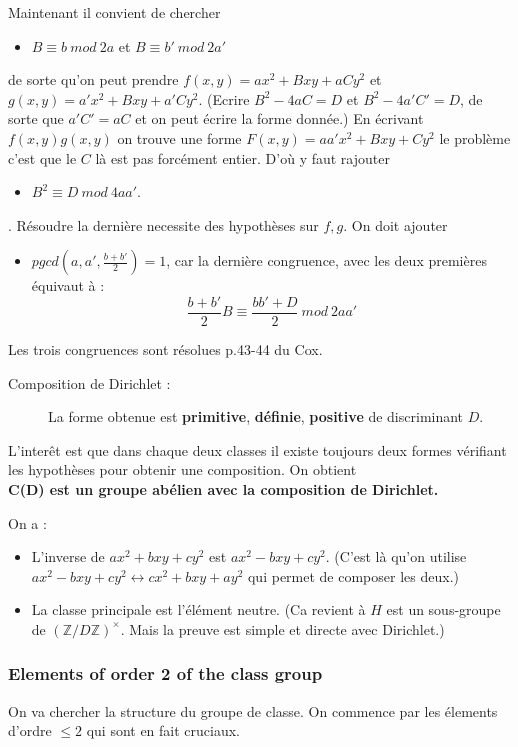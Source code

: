 \documentclass[12pt]{article}
\theoremstyle{plain}
\newcommand{\Z}{\mathbb{Z}}
\newcommand{\gr}{\color{Sepia}}
\begin{document}
Maintenant il convient de chercher
\begin{itemize}
    \item $B\equiv b~mod~2a$ et $B\equiv b'~mod~2a'$
\end{itemize}
de sorte qu'on peut prendre $f(x,y)=ax^2+Bxy+aCy^2$ et $g(x,y)=a'x^2+Bxy+a'Cy^2$. (Ecrire $B^2-4aC=D$ et $B^2-4a'C'=D$, de sorte que $a'C'=aC$ et on peut écrire la forme donnée.)
En écrivant $f(x,y)g(x,y)$ on trouve une forme $F(x,y)=aa'x^2+Bxy+Cy^2$ le problème c'est que le $C$ là est pas forcément entier. D'où
y faut rajouter 
\begin{itemize}
    \item $B^2\equiv D~mod~4aa'$.
\end{itemize}. Résoudre la dernière necessite des hypothèses sur $f,g$. On doit ajouter
\begin{itemize}
    \item $pgcd(a, a', \frac{b+b'}{2})=1$, car la dernière congruence, avec les deux premières équivaut à : $$\frac{b+b'}{2}B\equiv\frac{bb'+D}{2}~mod~2aa'$$
\end{itemize}
Les trois congruences sont résolues p.43-44 du Cox. 
\begin{description}
    \item[Composition de Dirichlet :] La forme obtenue est \textbf{primitive}, \textbf{définie}, \textbf{positive} de discriminant $D$.
\end{description}

L'interêt est que dans chaque deux classes il existe toujours deux formes vérifiant les hypothèses pour obtenir une composition. On obtient\\

\textbf{\gr C(D) est un groupe abélien avec la composition de Dirichlet.}

On a :
\begin{itemize}
    \item L'inverse de $ax^2+bxy+cy^2$ est $ax^2-bxy+cy^2$. (C'est là qu'on utilise $ax^2-bxy+cy^2\leftrightarrow cx^2+bxy+ay^2$ qui permet de composer les deux.)
    \item La classe principale est l'élément neutre. (Ca revient à $H$ est un sous-groupe de $(\Z/D\Z)^{\times}$. Mais la preuve est simple et directe avec Dirichlet.)
\end{itemize}
\newpage
\subsubsection{Elements of order 2 of the class group}
On va chercher la structure du groupe de classe. On commence par les élements d'ordre $\leq2$ qui sont en fait cruciaux.
\end{document}

